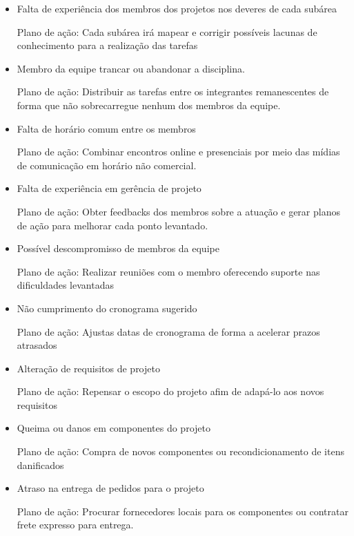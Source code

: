 \begin{itemize}
    \item Falta de experiência dos membros dos projetos nos deveres de cada 
    subárea

Plano de ação: Cada subárea irá mapear e corrigir possíveis lacunas de 
conhecimento para a realização das tarefas

    \item Membro da equipe trancar ou abandonar a disciplina.

Plano de ação: Distribuir as tarefas entre os integrantes remanescentes de 
forma que não sobrecarregue nenhum dos membros da equipe.

    \item Falta de horário comum entre os membros

Plano de ação: Combinar encontros online e presenciais por meio das mídias de 
comunicação em horário não comercial.

    \item Falta de experiência em gerência de projeto

Plano de ação: Obter feedbacks dos membros sobre a atuação e gerar planos de 
ação para melhorar cada ponto levantado.

    \item Possível descompromisso de membros da equipe

        Plano de ação: Realizar reuniões com o membro oferecendo suporte nas dificuldades levantadas

    \item Não cumprimento do cronograma sugerido

        Plano de ação: Ajustas datas de cronograma de forma a acelerar prazos atrasados

    \item Alteração de requisitos de projeto

        Plano de ação: Repensar o escopo do projeto afim de adapá-lo aos novos requisitos

    \item Queima ou danos em componentes do projeto

        Plano de ação: Compra de novos componentes ou recondicionamento de itens danificados

    \item Atraso na entrega de pedidos para o projeto

        Plano de ação: Procurar fornecedores locais para os componentes ou contratar frete expresso para entrega.
\end{itemize}



